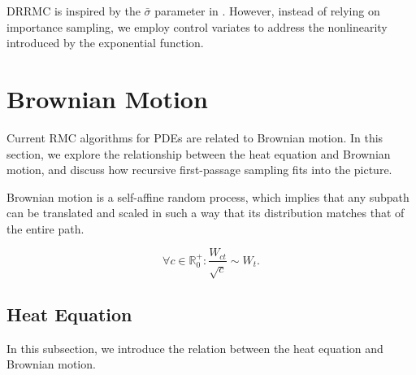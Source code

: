\documentclass[a4paper,12pt]{article}
\begin{document}
\begin{example}[DRRMC]
\end{example}

\begin{related}[DRRMC]
    DRRMC is inspired by the $\bar{\sigma}$ parameter in \cite{sawhney_grid-free_2022}.
    However, instead of relying on importance sampling, we employ control
    variates to address the nonlinearity introduced by the exponential
    function.
\end{related}

\section{Brownian Motion}

Current RMC algorithms for PDEs are related to Brownian motion. In this section,
we explore the relationship between the heat equation and Brownian motion,
and discuss how recursive first-passage sampling fits into the picture.



\begin{lemma} \label{lem:self affine}
    Brownian motion is a self-affine random process, which implies
    that any subpath can be translated and scaled in such a way
    that its distribution matches that of the entire path.

    \begin{equation}
        \forall c \in \mathbb{R}^{+}_{0}: \frac{W_{ct}}{\sqrt{c}} \sim W_{t}.
    \end{equation}
\end{lemma}


\subsection{Heat Equation}
In this subsection, we introduce the relation between the heat equation and
Brownian motion.
\end{document}
